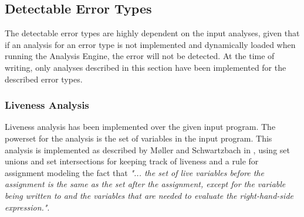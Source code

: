 \subsection{Detectable Error Types}

The detectable error types are highly dependent on the input analyses, given that if an analysis for an error type is not implemented and dynamically loaded when running the Analysis Engine, the error will not be detected. At the time of writing, only analyses described in this section have been implemented for the described error types. 

\subsubsection{Liveness Analysis}
Liveness analysis has been implemented over the given input program. The powerset for the analysis is the set of variables in the input program. 
This analysis is implemented as described by Møller and Schwartzbach in \cite{spa}, using set unions and set intersections for keeping track of liveness and a rule for assignment modeling the fact that \textit{"... the set of live variables before the assignment is the same as the set after the assignment, except for the variable being written to and the variables that are needed to evaluate the right-hand-side expression."}. 

